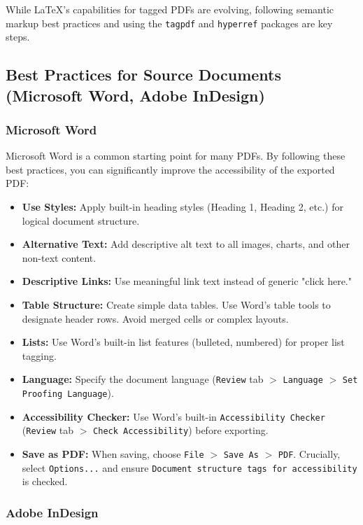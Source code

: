 While LaTeX's capabilities for tagged PDFs are evolving, following semantic markup best practices and using the \texttt{tagpdf} and \texttt{hyperref} packages are key steps.

\subsection{Best Practices for Source Documents (Microsoft Word, Adobe InDesign)}
\label{subsec:best-practices-source}

\subsubsection{Microsoft Word}
\label{subsubsec:word}

Microsoft Word is a common starting point for many PDFs. By following these best practices, you can significantly improve the accessibility of the exported PDF:

\begin{itemize}
\item \textbf{Use Styles:} Apply built-in heading styles (Heading 1, Heading 2, etc.) for logical document structure. \cite{MSWordPDF}
\item \textbf{Alternative Text:} Add descriptive alt text to all images, charts, and other non-text content.
\item \textbf{Descriptive Links:} Use meaningful link text instead of generic "click here."
\item \textbf{Table Structure:} Create simple data tables. Use Word's table tools to designate header rows. Avoid merged cells or complex layouts.
\item \textbf{Lists:} Use Word's built-in list features (bulleted, numbered) for proper list tagging.
\item \textbf{Language:} Specify the document language (\texttt{Review} tab $>$ \texttt{Language} $>$ \texttt{Set Proofing Language}).
\item \textbf{Accessibility Checker:} Use Word's built-in \texttt{Accessibility Checker} (\texttt{Review} tab $>$ \texttt{Check Accessibility}) before exporting.
\item \textbf{Save as PDF:} When saving, choose \texttt{File} $>$ \texttt{Save As} $>$ \texttt{PDF}. Crucially, select \texttt{Options...} and ensure \texttt{Document structure tags for accessibility} is checked.
\end{itemize}

\subsubsection{Adobe InDesign}
\label{subsubsec:indesign}

